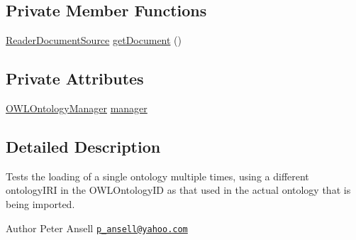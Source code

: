 \subsection*{Private Member Functions}
\begin{DoxyCompactItemize}
\item 
\hyperlink{classorg_1_1semanticweb_1_1owlapi_1_1io_1_1_reader_document_source}{Reader\-Document\-Source} \hyperlink{classorg_1_1semanticweb_1_1owlapi_1_1api_1_1test_1_1syntax_1_1rdfxml_1_1_multiple_distinct_ontology_loads_test_a9ef36aea5936feeb4008cb7aff9cff50}{get\-Document} ()
\end{DoxyCompactItemize}
\subsection*{Private Attributes}
\begin{DoxyCompactItemize}
\item 
\hyperlink{interfaceorg_1_1semanticweb_1_1owlapi_1_1model_1_1_o_w_l_ontology_manager}{O\-W\-L\-Ontology\-Manager} \hyperlink{classorg_1_1semanticweb_1_1owlapi_1_1api_1_1test_1_1syntax_1_1rdfxml_1_1_multiple_distinct_ontology_loads_test_ad562de040583d011fa350cd9b7ad054b}{manager}
\end{DoxyCompactItemize}


\subsection{Detailed Description}
Tests the loading of a single ontology multiple times, using a different ontology\-I\-R\-I in the O\-W\-L\-Ontology\-I\-D as that used in the actual ontology that is being imported.

\begin{DoxyAuthor}{Author}
Peter Ansell \href{mailto:p_ansell@yahoo.com}{\tt p\-\_\-ansell@yahoo.\-com} 
\end{DoxyAuthor}


